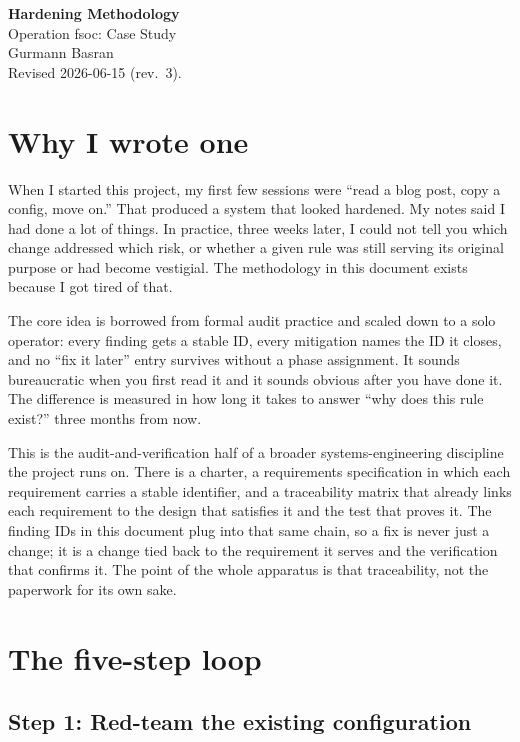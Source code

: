 \documentclass[12pt]{article}
\begin{document}
\begin{center}
{\LARGE\textbf{Hardening Methodology}}\\[4pt]
{\large Operation fsoc: Case Study}\\[6pt]
Gurmann Basran\\
\small Revised 2026-06-15 (rev.\ 3).
\end{center}

\section{Why I wrote one}

When I started this project, my first few sessions were ``read a blog post, copy a config, move on.'' That produced a system that looked hardened. My notes said I had done a lot of things. In practice, three weeks later, I could not tell you which change addressed which risk, or whether a given rule was still serving its original purpose or had become vestigial. The methodology in this document exists because I got tired of that.

The core idea is borrowed from formal audit practice and scaled down to a solo operator: every finding gets a stable ID, every mitigation names the ID it closes, and no ``fix it later'' entry survives without a phase assignment. It sounds bureaucratic when you first read it and it sounds obvious after you have done it. The difference is measured in how long it takes to answer ``why does this rule exist?'' three months from now.

This is the audit-and-verification half of a broader systems-engineering discipline the project runs on. There is a charter, a requirements specification in which each requirement carries a stable identifier, and a traceability matrix that already links each requirement to the design that satisfies it and the test that proves it. The finding IDs in this document plug into that same chain, so a fix is never just a change; it is a change tied back to the requirement it serves and the verification that confirms it. The point of the whole apparatus is that traceability, not the paperwork for its own sake.

\section{The five-step loop}

\subsection{Step 1: Red-team the existing configuration}
\end{document}
